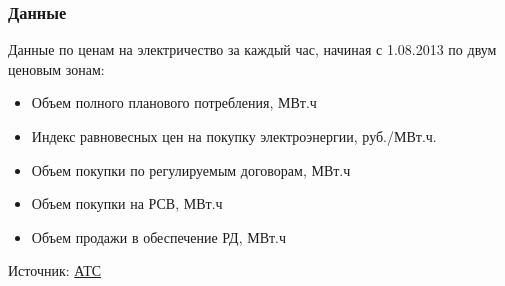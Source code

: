 \documentclass[c, dvipsnames]{beamer}  %
\begin{document}
\begin{frame}[shrink=5]
\frametitle{Данные} 


Данные по ценам на электричество за каждый час, начиная с 1.08.2013 по двум ценовым зонам: 

\begin{itemize}
	\item Объем полного планового потребления, МВт.ч
	\item Индекс равновесных цен на покупку электроэнергии, руб./МВт.ч.
	\item Объем покупки по регулируемым договорам, МВт.ч
	\item  Объем покупки на РСВ, МВт.ч	
	\item Объем продажи в обеспечение РД, МВт.ч	
%	
	
\end{itemize}

Источник: \href{https://www.atsenergo.ru/results/rsv}{АТС}




%
%
%
%
%


\end{frame}
\end{document}
